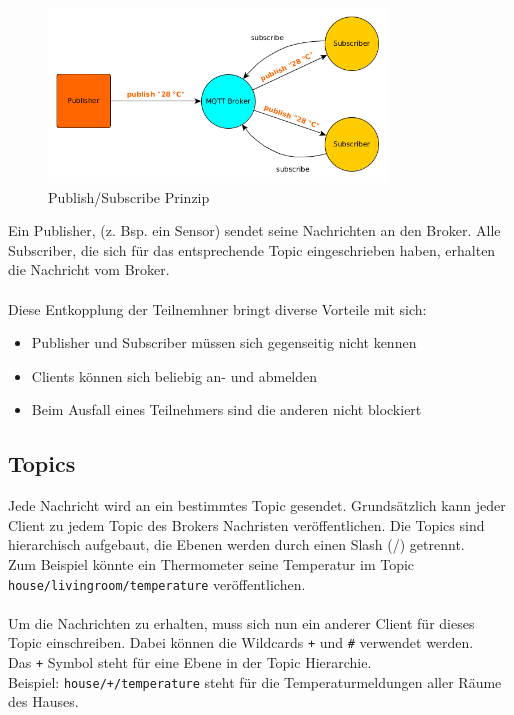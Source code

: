 \begin{figure}[H]
	\centering
		\includegraphics[width=0.8\textwidth]{diag/pub_sub.png}
	\caption{\label{fig:pub_sub}Publish/Subscribe Prinzip}
\end{figure}


\par
Ein Publisher, (z. Bsp. ein Sensor) sendet seine Nachrichten an den Broker. Alle Subscriber, die sich für das entsprechende Topic eingeschrieben haben, erhalten die Nachricht vom Broker. 
\\ \\
Diese Entkopplung der Teilnemhner bringt diverse Vorteile mit sich:

\begin{itemize}
\item Publisher und Subscriber müssen sich gegenseitig nicht kennen
\item Clients können sich beliebig an- und abmelden
\item Beim Ausfall eines Teilnehmers sind die anderen nicht blockiert
\end{itemize}

\subsection{Topics}
Jede Nachricht wird an ein bestimmtes Topic gesendet. Grundsätzlich kann jeder Client zu jedem Topic des Brokers Nachristen veröffentlichen. Die Topics sind hierarchisch aufgebaut, die Ebenen werden durch einen Slash (/) getrennt.\\
Zum Beispiel könnte ein Thermometer seine Temperatur im Topic \texttt{house/livingroom/temperature} veröffentlichen.\\ \\
Um die Nachrichten zu erhalten, muss sich nun ein anderer Client für dieses Topic einschreiben. Dabei können die Wildcards \texttt{+} und \texttt{\#} verwendet werden.\\
Das \texttt{+} Symbol steht für eine Ebene in der Topic Hierarchie.\\
Beispiel: \texttt{house/+/temperature} steht für die Temperaturmeldungen aller Räume des Hauses.

